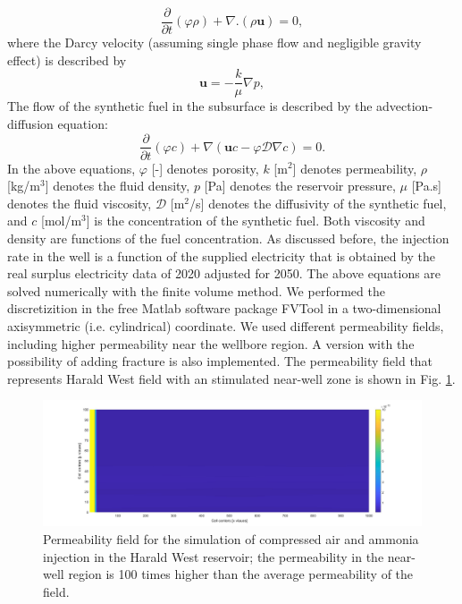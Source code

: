 \documentclass{ECOS_2021}
\begin{document}
\begin{equation}
\frac{\partial}{\partial t}\left(\varphi\rho\right)+\nabla.\left(\rho\mathbf{u}\right)=0,\label{eq:continuity}
\end{equation}
where the Darcy velocity (assuming single phase flow and negligible
gravity effect) is described by
\begin{equation}
\mathbf{u}=-\frac{k}{\mu}\nabla p,\label{eq:darcy}
\end{equation}
The flow of the synthetic fuel in the subsurface is described by the
advection-diffusion equation:
\begin{equation}
\frac{\partial}{\partial t}\left(\varphi c\right)+\nabla\left(\mathbf{u}c-\varphi\mathcal{D}\nabla c\right)=0.\label{eq:adv-diff-single}
\end{equation}
In the above equations, $\varphi$ {[}-{]} denotes porosity, $k$
{[}m$^{2}${]} denotes permeability, $\rho$ {[}kg/m$^{3}${]} denotes
the fluid density, $p$ {[}Pa{]} denotes the reservoir pressure, $\mu$
{[}Pa.s{]} denotes the fluid viscosity, $\mathcal{D}$ {[}m$^{2}$/s{]}
denotes the diffusivity of the synthetic fuel, and $c$ {[}mol/m$^{3}${]}
is the concentration of the synthetic fuel. Both viscosity and density
are functions of the fuel concentration. As discussed before, the
injection rate in the well is a function of the supplied electricity
that is obtained by the real surplus electricity data of 2020 adjusted
for 2050. The above equations are solved numerically with the finite
volume method. We performed the discretizition in the free Matlab
software package FVTool \cite{eftekhariFVToolFiniteVolume2015b} in
a two-dimensional axisymmetric (i.e. cylindrical) coordinate. We used
different permeability fields, including higher permeability near
the wellbore region. A version with the possibility of adding fracture
is also implemented. The permeability field that represents Harald
West field with an stimulated near-well zone is shown in Fig. \ref{fig:Permeability-field}.

\begin{figure}[H]
\includegraphics[width=14cm]{CA_perm_harald}

\caption{\label{fig:Permeability-field}Permeability field for the simulation
of compressed air and ammonia injection in the Harald West reservoir;
the permeability in the near-well region is 100 times higher than
the average permeability of the field.}
\end{figure}
\end{document}
